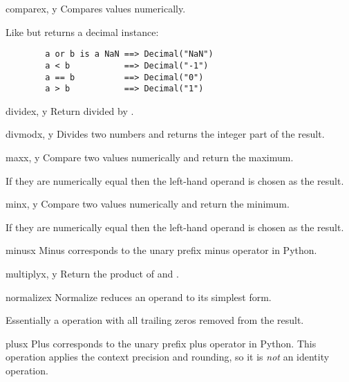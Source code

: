 \begin{methoddesc}{compare}{x, y}
  Compares values numerically.
  
  Like  but returns a decimal instance:
  \begin{verbatim}
        a or b is a NaN ==> Decimal("NaN")
        a < b           ==> Decimal("-1")
        a == b          ==> Decimal("0")
        a > b           ==> Decimal("1")
  \end{verbatim}                                          
\end{methoddesc}

\begin{methoddesc}{divide}{x, y}
  Return  divided by .
\end{methoddesc}   
  
\begin{methoddesc}{divmod}{x, y}
  Divides two numbers and returns the integer part of the result.
\end{methoddesc} 

\begin{methoddesc}{max}{x, y}
  Compare two values numerically and return the maximum.

  If they are numerically equal then the left-hand operand is chosen as the
  result.
\end{methoddesc} 
 
\begin{methoddesc}{min}{x, y}
  Compare two values numerically and return the minimum.

  If they are numerically equal then the left-hand operand is chosen as the
  result.
\end{methoddesc}

\begin{methoddesc}{minus}{x}
  Minus corresponds to the unary prefix minus operator in Python.
\end{methoddesc}

\begin{methoddesc}{multiply}{x, y}
  Return the product of  and .
\end{methoddesc}

\begin{methoddesc}{normalize}{x}
  Normalize reduces an operand to its simplest form.

  Essentially a  operation with all trailing zeros removed from
  the result.
\end{methoddesc}
  
\begin{methoddesc}{plus}{x}
  Plus corresponds to the unary prefix plus operator in Python.  This
  operation applies the context precision and rounding, so it is
  \emph{not} an identity operation.
\end{methoddesc}

